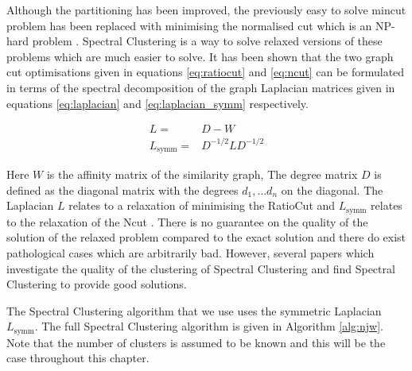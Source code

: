 Although the partitioning has been improved, the previously easy to solve mincut problem has been replaced with minimising the normalised cut which is an NP-hard problem \citep{Wagner1993}. Spectral Clustering is a way to solve relaxed versions of these problems \citep{Luxburg2008} which are much easier to solve.  It has been shown that the two graph cut optimisations given in equations \eqref{eq:ratiocut} and \eqref{eq:ncut} can be formulated in terms of the spectral decomposition of the graph Laplacian matrices given in equations \eqref{eq:laplacian} and \eqref{eq:laplacian_symm} respectively.  

\begin{eqnarray}
\label{eq:laplacian}
 L =& D - W\\
\label{eq:laplacian_symm}
 L_{\text{symm}} =& D^{-1/2}LD^{-1/2} 
\end{eqnarray}

Here $W$ is the affinity matrix of the similarity graph,  The degree matrix $D$ is defined as the diagonal matrix with the degrees $d_1, \ldots d_n$ on the diagonal. The Laplacian $L$ relates to a relaxation of minimising the RatioCut and $L_{\text{symm}}$ relates to the relaxation of the Ncut \citep{chung1997spectral}. There is no guarantee on the quality of the solution of the relaxed problem compared to the exact solution and there do exist pathological cases which are arbitrarily bad. However, several papers which investigate the quality of the clustering of Spectral Clustering \cite{Spielman1996} and \cite{Kannan2004} find Spectral Clustering to provide good solutions. 

The Spectral Clustering algorithm that we use \citep{Malik2000} uses the symmetric Laplacian  $L_{\text{symm}}$. The full Spectral Clustering algorithm is given in Algorithm \ref{alg:njw}. Note that the number of clusters is assumed to be known and this will be the case throughout this chapter.


